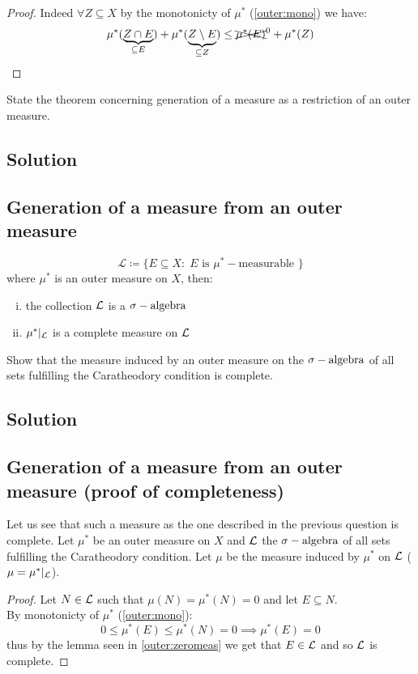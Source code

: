 \begin{proof}\label{outer:zeromeas}
    Indeed $\forall Z \subseteq X$ by the monotonicty of $\mu^*$ (\ref{outer:mono}) we have:
    \[
        \mu^*(\underbrace{Z\cap E}_{\subseteq E}) + \mu^*(\underbrace{Z\setminus E}_{\subseteq Z}) \leq \xcancel{\mu^*(E)}^0 + \mu^*(Z)
    \]
\end{proof}



\question
State the theorem concerning generation of a measure as a restriction of an outer measure.

\subsection*{Solution}
\subsection{Generation of a measure from an outer measure}\label{meas:gen}
\provdef[$\mathcal{L}$]
\[
    \mathcal{L} \coloneqq \{ E\subseteq X : \; E \text{ is } \mu^*-\text{measurable } \}    
\]
where $\mu^*$ is an outer measure on $X$, then:
\begin{enumerate}[i)]
    \item the collection $\mathcal{L}$ is a $\sigma-\text{algebra}$
    \item $\mu^* |_{\mathcal{L}}$ is a complete measure on $\mathcal{L}$
\end{enumerate}


\question
Show that the measure induced by an outer measure on the $\sigma-\text{algebra}$ of all sets fulfilling the
Caratheodory condition is complete.

\subsection*{Solution}
\subsection{Generation of a measure from an outer measure (proof of completeness)}
Let us see that such a measure as the one described in the previous question is complete. Let $\mu^*$ be an outer measure on $X$ and $\mathcal{L}$ the $\sigma-\text{algebra}$ of all sets fulfilling the Caratheodory condition. Let $\mu$ be the measure induced by $\mu^*$ on $\mathcal{L}$ ($\mu=\mu^* |_{\mathcal{L}}$).
\begin{proof}
    Let $N\in\mathcal{L}$ such that $\mu(N)=\mu^*(N)=0$ and let $E\subseteq N$.\\
    By monotonicty of $\mu^*$ (\ref{outer:mono}):
    \[
        0\leq \mu^*(E)\leq \mu^*(N)=0 \implies \mu^*(E)=0   
    \]
    thus by the lemma seen in \ref{outer:zeromeas} we get that $E\in\mathcal{L}$ and so $\mathcal{L}$ is complete.
\end{proof}

